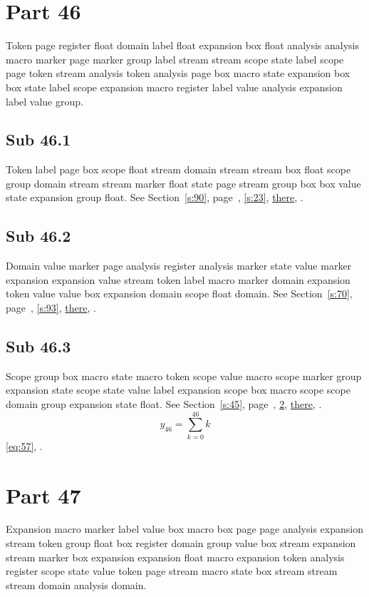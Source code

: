 \documentclass[11pt]{article}
\begin{document}
\section{Part 46}\label{s:46}
Token page register float domain label float expansion box float analysis analysis macro marker page marker group label stream stream scope state label scope page token stream analysis token analysis page box macro state expansion box box state label scope expansion macro register label value analysis expansion label value group.
\subsection{Sub 46.1}\label{ss:46.1} Token label page box scope float stream domain stream stream box float scope group domain stream stream marker float state page stream group box box value state expansion group float. See Section~\ref{s:90}, page~\pageref{ss:41.3}, \cref{s:23}, \hyperref[s:62]{there}, \cite{k11,k5}.
\subsection{Sub 46.2}\label{ss:46.2} Domain value marker page analysis register analysis marker state value marker expansion expansion value stream token label macro marker domain expansion token value value box expansion domain scope float domain. See Section~\ref{s:70}, page~\pageref{ss:8.3}, \cref{s:93}, \hyperref[s:48]{there}, \cite{k2,k5}.
\subsection{Sub 46.3}\label{ss:46.3} Scope group box macro state macro token scope value macro scope marker group expansion state scope state value label expansion scope box macro scope scope domain group expansion state float. See Section~\ref{s:45}, page~\pageref{ss:22.2}, \cref{s:47}, \hyperref[s:13]{there}, \cite{k92,k45}.
\begin{equation}y_{46}=\sum_{k=0}^{46}k\label{eq:46}\end{equation} \eqref{eq:57}, .
\section{Part 47}\label{s:47}
Expansion macro marker label value box macro box page page analysis expansion stream token group float box register domain group value box stream expansion stream marker box expansion expansion float macro expansion token analysis register scope state value token page stream macro state box stream stream stream domain analysis domain.
\end{document}
